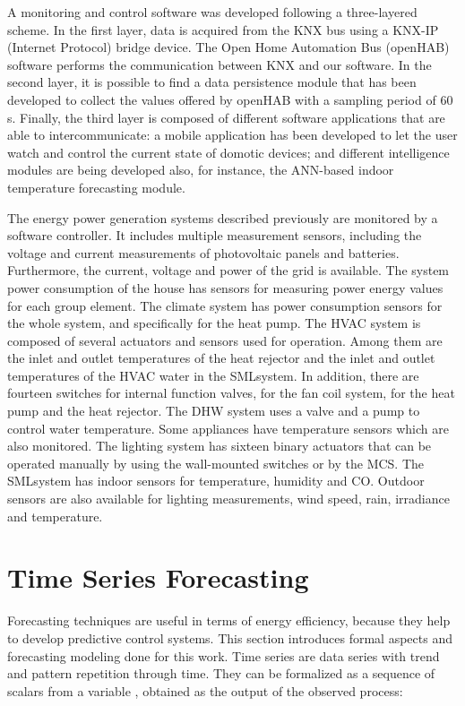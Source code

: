 \documentclass[energies,article,accept,moreauthors,pdftex,12pt,a4paper]{mdpi}
\newcommand{\ann}{ANN\xspace}
\newcommand{\openhab}{openHAB\xspace}
\newcommand{\mcs}{MCS\xspace}
\newcommand{\knx}{KNX\xspace}
\newcommand{\smlsystem}{SMLsystem\xspace}
\begin{document}
A monitoring and control software was developed following a three-layered scheme.
In the first layer, data is acquired from the \knx bus using a \knx-IP (Internet Protocol) bridge device.
The Open Home Automation Bus  (\openhab)~\cite{openhab} software performs
the communication between \knx and our software.
In the second layer, it is possible to find a data persistence module that
has been developed to collect the values offered by \openhab with a
sampling period of 60 s. Finally, the third layer is
composed of different software applications that are able to
intercommunicate: a mobile application has been developed to let the
user watch and control the current state of domotic devices;
and different intelligence modules are being developed also, for instance,
the \ann-based indoor temperature forecasting module.

The energy power generation systems described previously are monitored by a software
controller. It includes multiple measurement sensors, including the voltage and
current measurements of photovoltaic panels and batteries. Furthermore, the
current, voltage and power of the grid is available. The system power
consumption of the house has sensors for measuring power energy values for each
group element. The climate system has power consumption sensors for the whole
system, and specifically for the heat pump. The HVAC system is composed of
several actuators and sensors used for operation. Among them are the inlet and
outlet temperatures of the heat rejector and the inlet and outlet temperatures
of the HVAC water in the \smlsystem. In addition, there are fourteen switches for
internal function valves, for the fan coil system, for the heat pump
and the heat rejector. The DHW system uses a valve and a pump to control water
temperature. Some appliances have temperature sensors which are also monitored.
The lighting system has sixteen binary actuators that can be operated manually by
using the wall-mounted switches or by the \mcs. The \smlsystem has indoor
sensors for temperature, humidity and CO. Outdoor sensors are also
available for lighting measurements, wind speed, rain, irradiance and
temperature.

\section{Time Series Forecasting}\label{sec:forecasting}

Forecasting techniques are useful in terms of energy efficiency, because they
help to develop predictive control systems. This section introduces formal
aspects and forecasting modeling done for this work. Time series are data
series with trend and pattern repetition through time. They can be formalized as
a sequence of scalars from a variable , obtained as the output of the observed process:
\end{document}
